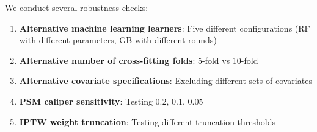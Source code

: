We conduct several robustness checks:

\begin{enumerate}
	\item \textbf{Alternative machine learning learners}: Five different configurations (RF with different parameters, GB with different rounds)
	\item \textbf{Alternative number of cross-fitting folds}: 5-fold vs 10-fold
	\item \textbf{Alternative covariate specifications}: Excluding different sets of covariates
	\item \textbf{PSM caliper sensitivity}: Testing 0.2, 0.1, 0.05
	\item \textbf{IPTW weight truncation}: Testing different truncation thresholds
\end{enumerate}